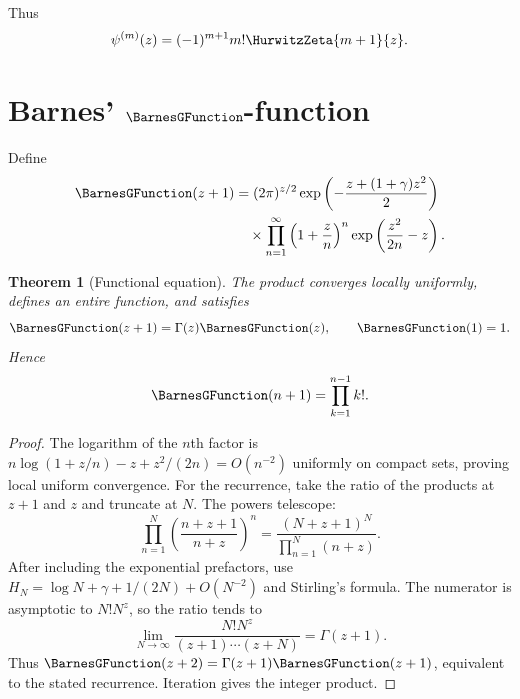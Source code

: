 \documentclass[11pt,a4paper,oneside,openany]{book}
\newtheorem{theorem}{Theorem}[chapter]
\theoremstyle{definition}
\theoremstyle{remark}
\begin{document}
Thus
\begin{equation}\label{unif:eq-polygamma-hurwitz}
 \psi^{(m)}(z)=(-1)^{m+1}m!\HurwitzZeta{m+1}{z}.
\end{equation}

\section{Barnes' \texorpdfstring{$\BarnesGFunction$}{G}-function}

Define
\begin{align}
 \BarnesGFunction(z+1)&=(2\pi)^{z/2}
 \exp\left(-\frac{z+(1+\gamma)z^2}{2}\right)
 \notag\\
 &\quad\times\prod_{n=1}^{\infty}
 \left(1+\frac zn\right)^n
 \exp\left(\frac{z^2}{2n}-z\right).
 \label{unif:eq-barnes-product}
\end{align}

\begin{theorem}[Functional equation]
\label{unif:thm-barnes-functional}
The product converges locally uniformly, defines an entire function, and
satisfies
\begin{equation}\label{unif:eq-barnes-functional}
 \BarnesGFunction(z+1)=\Gamma(z)\BarnesGFunction(z),\qquad \BarnesGFunction(1)=1.
\end{equation}
Hence
\begin{equation}\label{unif:eq-barnes-integers}
 \BarnesGFunction(n+1)=\prod_{k=1}^{n-1}k!.
\end{equation}
\end{theorem}
\begin{proof}
The logarithm of the $n$th factor is
$n\log(1+z/n)-z+z^2/(2n)=O(n^{-2})$ uniformly on compact sets, proving local
uniform convergence. For the recurrence, take the ratio of the products at
$z+1$ and $z$ and truncate at $N$. The powers telescope:
\[
 \prod_{n=1}^{N}\left(\frac{n+z+1}{n+z}\right)^n
 =\frac{(N+z+1)^N}{\prod_{n=1}^{N}(n+z)}.
\]
After including the exponential prefactors, use
$H_N=\log N+\gamma+1/(2N)+O(N^{-2})$ and Stirling's formula. The numerator is
asymptotic to $N!N^z$, so the ratio tends to
\[
 \lim_{N\to\infty}\frac{N!N^z}{(z+1)\cdots(z+N)}=\Gamma(z+1).
\]
Thus $\BarnesGFunction(z+2)=\Gamma(z+1)\BarnesGFunction(z+1)$, equivalent to the stated recurrence.
Iteration gives the integer product.
\end{proof}
\end{document}
